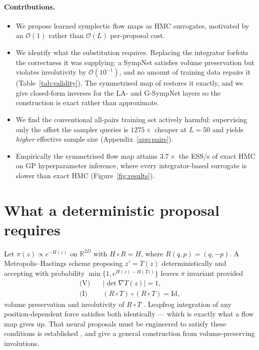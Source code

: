 \documentclass[mlabstract,onecolumn]{jmlr}
\def\R{\mathbb{R}}
\newcommand{\Ham}{H}
\newcommand{\flip}{R}
\begin{document}
\paragraph{Contributions.}
\begin{itemize}
    \item We propose learned symplectic flow maps as HMC surrogates, motivated
    by an $\mathcal{O}(1)$ rather than $\mathcal{O}(L)$ per-proposal cost.
    \item We identify what the substitution requires. Replacing the integrator
    forfeits the correctness it was supplying: a SympNet satisfies volume
    preservation but violates involutivity by $\mathcal{O}(10^{-1})$, and no
    amount of training data repairs it (Table~\ref{tab:validity}). The symmetrised
    map of \citet{valperga2022reversible} restores it exactly, and we give
    closed-form inverses for the LA- and G-SympNet layers so the construction
    is exact rather than approximate.
    \item We find the conventional all-pairs training set actively harmful:
    supervising only the offset the sampler queries is $1275\times$ cheaper at
    $L=50$ and yields \emph{higher} effective sample size (Appendix~\ref{app:pairs}).
    \item Empirically the symmetrised flow map attains $3.7\times$ the ESS/s of
    exact HMC on GP hyperparameter inference, where every integrator-based
    surrogate is slower than exact HMC (Figure~\ref{fig:results}).
\end{itemize}

\section{What a deterministic proposal requires}

Let $\pi(z) \propto e^{-\Ham(z)}$ on $\R^{2D}$ with $\Ham \circ \flip = \Ham$,
where $\flip(q,p) = (q,-p)$. A Metropolis--Hastings scheme proposing $z' = T(z)$
deterministically and accepting with probability
$\min\{1, e^{\Ham(z) - \Ham(Tz)}\}$ leaves $\pi$ invariant provided
\begin{align}
    \text{(V)} \quad & |\det \nabla T(z)| = 1, \label{eq:vol}\\
    \text{(I)} \quad & (\flip \circ T) \circ (\flip \circ T) = \mathrm{Id},
    \label{eq:inv}
\end{align}
volume preservation and involutivity of $\flip \circ T$
\citep{Green1995,Tierney1998}. Leapfrog integration of any position-dependent
force satisfies both identically --- which is exactly what a flow map gives up.
That neural proposals must be engineered to satisfy these conditions is
established \citep{song2017nice,levy2018generalizing}, and
\citet{spanbauer2020involutive} give a general construction from
volume-preserving involutions.
\end{document}
